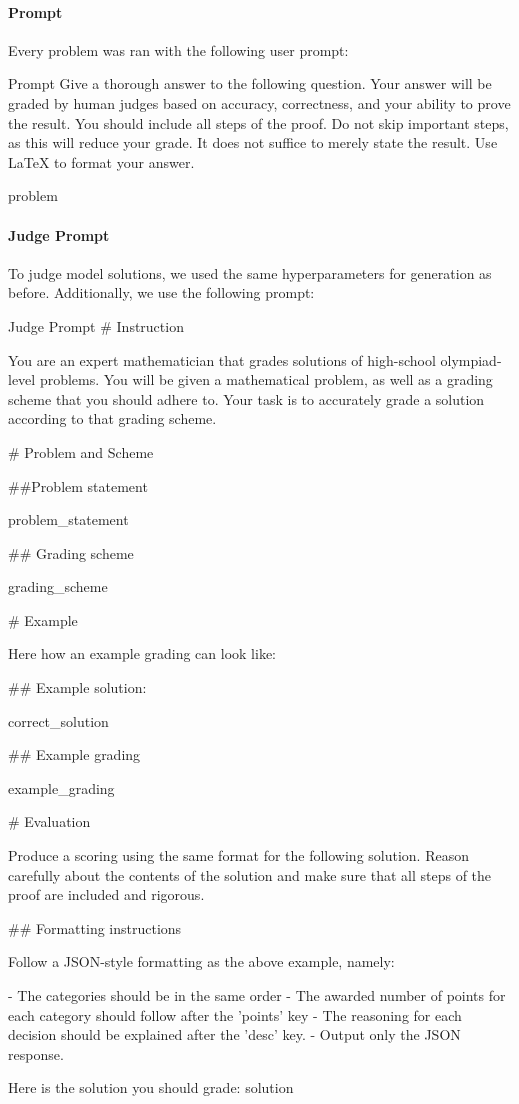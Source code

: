 \paragraph{Prompt} Every problem was ran with the following user prompt:

\begin{prompt}{Prompt}
Give a thorough answer to the following question. Your answer will be graded by human judges based on accuracy, correctness, and your ability to prove the result. You should include all steps of the proof. Do not skip important steps, as this will reduce your grade. It does not suffice to merely state the result. Use LaTeX to format your answer.

{problem}
\end{prompt}

\paragraph{Judge Prompt} To judge model solutions, we used the same hyperparameters for generation as before. Additionally, we use the following prompt:

\begin{prompt}{Judge Prompt}
# Instruction

You are an expert mathematician that grades solutions of high-school olympiad-level problems. You will be given a mathematical problem, as well as a grading scheme that you should adhere to. Your task is to accurately grade a solution according to that grading scheme.

# Problem and Scheme 

##Problem statement 

{problem_statement}

## Grading scheme

{grading_scheme}

# Example 

Here how an example grading can look like:

## Example solution:

{correct_solution}

## Example grading

{example_grading}

# Evaluation

Produce a scoring using the same format for the following solution. Reason carefully about the contents of the solution and make sure that all steps of the proof are included and rigorous.

## Formatting instructions

Follow a JSON-style formatting as the above example, namely:

- The categories should be in the same order
- The awarded number of points for each category should follow after the 'points' key
- The reasoning for each decision should be explained after the 'desc' key.
- Output only the JSON response.

Here is the solution you should grade:
{solution}
\end{prompt}

